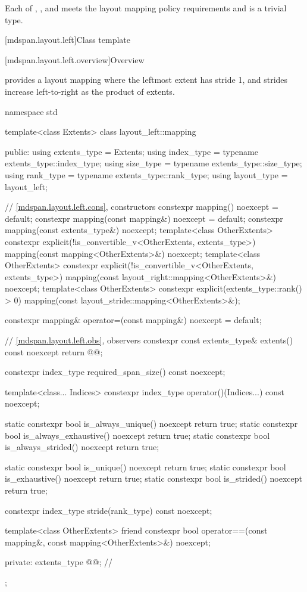 \pnum
Each of , , and 
meets the layout mapping policy requirements and is a trivial type.

[mdspan.layout.left]{Class template }

[mdspan.layout.left.overview]{Overview}

\pnum
{} provides a layout mapping
where the leftmost extent has stride 1, and
strides increase left-to-right as the product of extents.

\begin{codeblock}
namespace std {
  template<class Extents>
  class layout_left::mapping {
  public:
    using extents_type = Extents;
    using index_type = typename extents_type::index_type;
    using size_type = typename extents_type::size_type;
    using rank_type = typename extents_type::rank_type;
    using layout_type = layout_left;

    // \ref{mdspan.layout.left.cons}, constructors
    constexpr mapping() noexcept = default;
    constexpr mapping(const mapping&) noexcept = default;
    constexpr mapping(const extents_type&) noexcept;
    template<class OtherExtents>
      constexpr explicit(!is_convertible_v<OtherExtents, extents_type>)
        mapping(const mapping<OtherExtents>&) noexcept;
    template<class OtherExtents>
      constexpr explicit(!is_convertible_v<OtherExtents, extents_type>)
        mapping(const layout_right::mapping<OtherExtents>&) noexcept;
    template<class OtherExtents>
      constexpr explicit(extents_type::rank() > 0)
        mapping(const layout_stride::mapping<OtherExtents>&);

    constexpr mapping& operator=(const mapping&) noexcept = default;

    // \ref{mdspan.layout.left.obs}, observers
    constexpr const extents_type& extents() const noexcept { return @@; }

    constexpr index_type required_span_size() const noexcept;

    template<class... Indices>
      constexpr index_type operator()(Indices...) const noexcept;

    static constexpr bool is_always_unique() noexcept { return true; }
    static constexpr bool is_always_exhaustive() noexcept { return true; }
    static constexpr bool is_always_strided() noexcept { return true; }

    static constexpr bool is_unique() noexcept { return true; }
    static constexpr bool is_exhaustive() noexcept { return true; }
    static constexpr bool is_strided() noexcept { return true; }

    constexpr index_type stride(rank_type) const noexcept;

    template<class OtherExtents>
      friend constexpr bool operator==(const mapping&, const mapping<OtherExtents>&) noexcept;

  private:
    extents_type @@{};    // \expos
  };
}
\end{codeblock}

